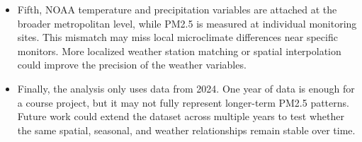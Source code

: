 \documentclass[
  letterpaper,
  DIV=11,
  numbers=noendperiod]{scrartcl}
\begin{document}
\begin{itemize}
  model does not directly include episodic external events such as
  wildfire smoke, dust storms, extreme heat events, regional pollution
  transport, or other natural-disaster-related air quality shocks.
  Therefore, these factors should be treated as contextual
  interpretations rather than causal variables. Future work could add
  smoke plume data, fire counts, satellite aerosol measurements, dust
  event indicators, extreme-weather indicators, or distance-to-fire
  variables to better capture these short-term pollution episodes.
\item
  Fifth, NOAA temperature and precipitation variables are attached at
  the broader metropolitan level, while PM2.5 is measured at individual
  monitoring sites. This mismatch may miss local microclimate
  differences near specific monitors. More localized weather station
  matching or spatial interpolation could improve the precision of the
  weather variables.
\item
  Finally, the analysis only uses data from 2024. One year of data is
  enough for a course project, but it may not fully represent
  longer-term PM2.5 patterns. Future work could extend the dataset
  across multiple years to test whether the same spatial, seasonal, and
  weather relationships remain stable over time.
\end{itemize}
\end{document}
